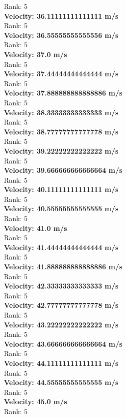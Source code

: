 \documentclass{article}
\begin{document}
Rank: 5\\
\textbf{Velocity: 36.11111111111111 m/s}\\
Rank: 5\\
\textbf{Velocity: 36.55555555555556 m/s}\\
Rank: 5\\
\textbf{Velocity: 37.0 m/s}\\
Rank: 5\\
\textbf{Velocity: 37.44444444444444 m/s}\\
Rank: 5\\
\textbf{Velocity: 37.888888888888886 m/s}\\
Rank: 5\\
\textbf{Velocity: 38.33333333333333 m/s}\\
Rank: 5\\
\textbf{Velocity: 38.77777777777778 m/s}\\
Rank: 5\\
\textbf{Velocity: 39.22222222222222 m/s}\\
Rank: 5\\
\textbf{Velocity: 39.666666666666664 m/s}\\
Rank: 5\\
\textbf{Velocity: 40.11111111111111 m/s}\\
Rank: 5\\
\textbf{Velocity: 40.55555555555555 m/s}\\
Rank: 5\\
\textbf{Velocity: 41.0 m/s}\\
Rank: 5\\
\textbf{Velocity: 41.44444444444444 m/s}\\
Rank: 5\\
\textbf{Velocity: 41.888888888888886 m/s}\\
Rank: 5\\
\textbf{Velocity: 42.33333333333333 m/s}\\
Rank: 5\\
\textbf{Velocity: 42.77777777777778 m/s}\\
Rank: 5\\
\textbf{Velocity: 43.22222222222222 m/s}\\
Rank: 5\\
\textbf{Velocity: 43.666666666666664 m/s}\\
Rank: 5\\
\textbf{Velocity: 44.11111111111111 m/s}\\
Rank: 5\\
\textbf{Velocity: 44.55555555555555 m/s}\\
Rank: 5\\
\textbf{Velocity: 45.0 m/s}\\
Rank: 5\\
\end{document}

